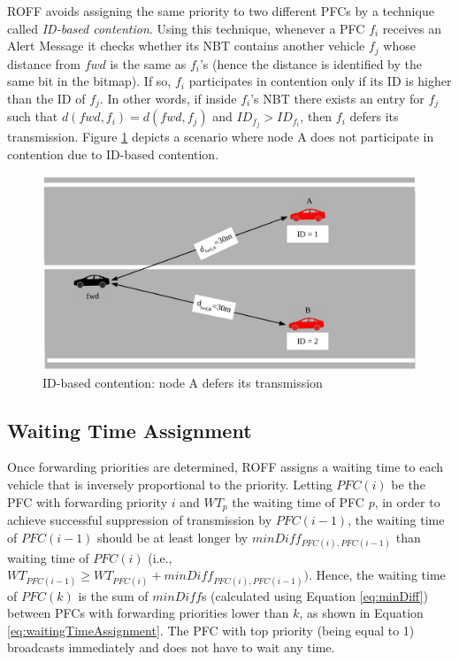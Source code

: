 			
			ROFF avoids assigning the same priority to two different PFCs by a technique called \textit{ID-based contention}. Using this technique, whenever a PFC $f_i$ receives an Alert Message it checks whether its NBT contains another vehicle $f_j$ whose distance from $fwd$ is the same as $f_i$'s (hence the distance is identified by the same bit in the bitmap). If so, $f_i$ participates in contention only if its ID is higher than the ID of $f_j$. In other words, if inside $f_i$'s NBT there exists an entry for $f_j$ such that $d(fwd, f_i) = d(fwd, f_j)$ and $ID_{f_j} > ID_{f_i}$, then $f_i$ defers its transmission. Figure \ref{fig:idBasedContention} depicts a scenario where node A does not participate in contention due to ID-based contention.
	
			\begin{figure}[H]
				\centering
				\includegraphics[width=\textwidth]{immagini/idBasedContention}
				\caption{ID-based contention: node A defers its transmission}
				\label{fig:idBasedContention}
			\end{figure}
		
		\subsection{Waiting Time Assignment}
			Once forwarding priorities are determined, ROFF assigns a waiting time to each vehicle that is inversely proportional to the priority. Letting $PFC(i)$ be the PFC with forwarding priority $i$ and $WT_p$ the waiting time of PFC $p$, in order to achieve successful suppression of transmission by $PFC(i-1)$, the waiting time of $PFC(i-1)$ should be at least longer by $minDiff_{PFC(i), PFC(i-1)}$ than waiting time of $PFC(i)$ (i.e., $WT_{PFC(i-1)} \geq WT_{PFC(i)} + minDiff_{PFC(i), PFC(i-1)})$. Hence, the waiting time of $PFC(k)$ is the sum of $minDiff$s (calculated using Equation \ref{eq:minDiff}) between PFCs with forwarding priorities lower than $k$, as shown in Equation \ref{eq:waitingTimeAssignment}. The PFC with top priority (being equal to 1) broadcasts immediately and does not have to wait any time.
			
